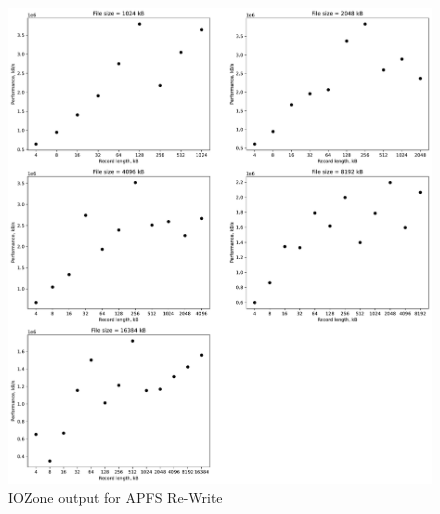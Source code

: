 \begin{figure}[!htb]
	\label{fig:app_bench_apfs_re_write}
	\begin{center}
		\includegraphics[width=1.0\textwidth]{figures/benchmarking/local/Re-Write.pdf}
	\end{center}
	\caption{IOZone output for APFS Re-Write}
\end{figure}

